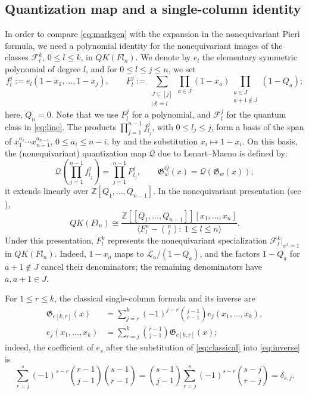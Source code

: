 \documentclass[11pt,a4paper,reqno]{amsart}
\DeclareRobustCommand{\rev}[1]{{\color{revision}#1}}
\numberwithin{equation}{section}
\theoremstyle{definition}
\newcommand{\Z}{\mathbb Z}
\newcommand{\FF}{\mathcal F}
\newcommand{\GG}{\mathfrak G}
\begin{document}
\subsection{Quantization map and a single-column identity}\label{sub:quantization}
\rev{In order to compare \eqref{eq:markgen} with the expansion in the nonequivariant Pieri formula, we need a polynomial identity for the nonequivariant images of the classes \(\FF_l^k\), \(0 \le l \le k\), in \(QK(Fl_n)\). We denote by \(e_l\) the elementary symmetric polynomial of degree \(l\), and for \(0\le l\le j\le n\), we set}
\[
 f_l^j:=e_l(1-x_1,\ldots,1-x_j),\qquad
 F_l^j:=\sum_{\substack{J\subseteq[j]\\|J|=l}}
        \prod_{a\in J}(1-x_a)
        \prod_{\substack{a\in J\\a+1\notin J}}(1-Q_a);
\]
here, \(Q_n=0\). Note that we use \(F_l^j\) for a polynomial, and \(\FF_l^j\) for the quantum class in \eqref{eq:line}. The products
\(\prod_{j=1}^{n-1}f_{l_j}^j\), with \(0\le l_j\le j\), form a basis of the span of \(x_1^{a_1}\cdots x_{n-1}^{a_{n-1}}\), \(0\le a_i\le n-i\), by \cite[Proposition~2.7]{LeM} and the substitution \(x_i\mapsto1-x_i\). On this basis, the (nonequivariant) quantization map \(\mathcal{Q}\) due to Lenart--Maeno is defined by:
\begin{equation}\label{eq:quantize}
 \mathcal Q\left(\prod_{j=1}^{n-1} f_{l_j}^j\right)
          =\prod_{j=1}^{n-1} F_{l_j}^j,\qquad
 \GG_w^Q(x)=\mathcal Q(\GG_w(x)); 
\end{equation}
it extends linearly over \(\Z[Q_1,\ldots,Q_{n-1}]\). In the nonequivariant presentation (see \cite{MNS1,MNS2}),
\[
 QK(Fl_n)\cong
 \frac{\Z[[Q_1,\ldots,Q_{n-1}]][x_1,\ldots,x_n]}
 {\langle F_l^n-\binom nl:\ 1\le l\le n \rangle} .
\]
Under this presentation, \(F_l^k\) represents the nonequivariant specialization \(\FF_l^k|_{e^\lambda=1}\) in \(QK(Fl_n)\). Indeed, \(1-x_a\) maps to \(\mathcal{L}_a/(1-Q_a)\), and the factors \(1-Q_a\) for \(a+1\notin J\) cancel their denominators; the remaining denominators have \(a,a+1\in J\).

For \(1\le r\le k\), the classical single-column formula \cite[(2.3)]{LeM} and its inverse are
\begin{align}
 \GG_{c[k,r]}(x)&=\sum_{j=r}^k(-1)^{j-r}\binom{j-1}{r-1}e_j(x_1,\ldots,x_k),\label{eq:classical}\\
 e_j(x_1,\ldots,x_k)&=\sum_{r=j}^k\binom{r-1}{j-1}\GG_{c[k,r]}(x); \label{eq:inverse}
\end{align}
indeed, the coefficient of \(e_s\) after the substitution of \eqref{eq:classical} into \eqref{eq:inverse} is
\[
 \sum_{r=j}^s(-1)^{s-r}\binom{r-1}{j-1}\binom{s-1}{r-1}
 =\binom{s-1}{j-1}\sum_{r=j}^s(-1)^{s-r}\binom{s-j}{r-j}
 =\delta_{s,j}.
\]
\end{document}
